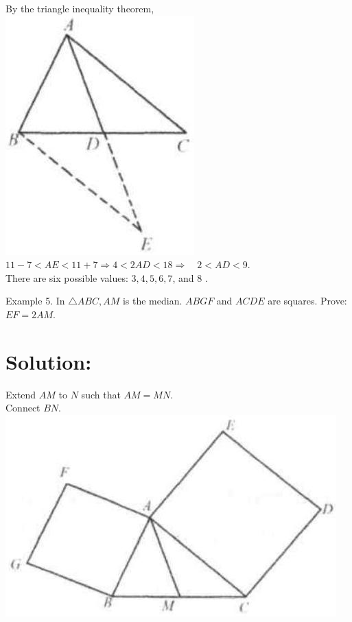 \documentclass[10pt]{article}
\begin{document}
By the triangle inequality theorem,\\
\includegraphics[max width=\textwidth, center]{2025_04_17_97bc1f7e44d93c271a88g-025(1)}\\
\(11-7<A E<11+7 \Rightarrow 4<2 A D<18 \Rightarrow \quad 2<A D<9\).\\
There are six possible values: \(3,4,5,6,7\), and 8 .

Example 5. In \(\triangle A B C, A M\) is the median. \(A B G F\) and \(A C D E\) are squares. Prove:\\
\(E F=2 A M\).

\section*{Solution:}
Extend \(A M\) to \(N\) such that \(A M=M N\).\\
Connect \(B N\).\\
\includegraphics[max width=\textwidth, center]{2025_04_17_97bc1f7e44d93c271a88g-025(2)}
\end{document}
